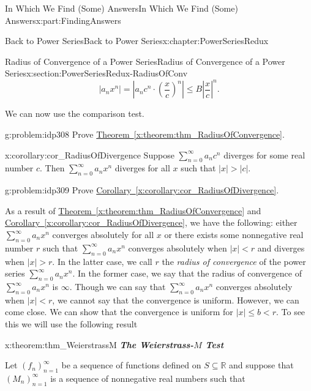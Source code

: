 \documentclass[oneside,10pt,]{book}
\newcommand{\xreffont}{\relax}
\newcommand{\alert}[1]{\textbf{\textit{#1}}}
\numberwithin{equation}{section}
\newcommand{\abs}[1]{\left|#1\right|}
\newcommand{\RR}{\mathbb {R}}
\newcommand{\lt}{<}
\begin{document}
\begin{partptx}{In Which We Find (Some) Answers}{}{In Which We Find (Some) Answers}{}{}{x:part:FindingAnswers}
\begin{chapterptx}{Back to Power Series}{}{Back to Power Series}{}{}{x:chapter:PowerSeriesRedux}
\begin{sectionptx}{Radius of Convergence of a Power Series}{}{Radius of Convergence of a Power Series}{}{}{x:section:PowerSeriesRedux-RadiusOfConv}
\begin{equation*}
\abs{a_nx^n}=\abs{a_nc^n\cdot\left(\frac{x}{c}\right)^n}\leq B\abs{\frac{x}{c}}^n\text{.}
\end{equation*}
%
\par
We can now use the comparison test.%
\begin{problem}{}{g:problem:idp308}%
 Prove \hyperref[x:theorem:thm_RadiusOfConvergence]{Theorem~{\xreffont\ref{x:theorem:thm_RadiusOfConvergence}}}.%
\end{problem}
\begin{corollary}{}{}{x:corollary:cor_RadiusOfDivergence}%
Suppose \(\sum_{n=0}^\infty a_nc^n\) diverges for some real number \(c\). Then \(\sum_{n=0}^\infty a_nx^n\) diverges for all \(x\) such that \(|x|>|c|\).%
\end{corollary}
\begin{problem}{}{g:problem:idp309}%
 Prove \hyperref[x:corollary:cor_RadiusOfDivergence]{Corollary~{\xreffont\ref{x:corollary:cor_RadiusOfDivergence}}}.%
\end{problem}
As a result of \hyperref[x:theorem:thm_RadiusOfConvergence]{Theorem~{\xreffont\ref{x:theorem:thm_RadiusOfConvergence}}} and \hyperref[x:corollary:cor_RadiusOfDivergence]{Corollary~{\xreffont\ref{x:corollary:cor_RadiusOfDivergence}}}, we have the following: either \(\sum_{n=0}^\infty a_nx^n\) converges absolutely for all \(x\) or there exists some nonnegative real number \(r\) such that \(\sum_{n=0}^\infty a_nx^n\) converges absolutely when \(|x|\lt r\) and diverges when \(|x|>r\). In the latter case, we call \(r\) the \emph{radius of convergence} of the power series \(\sum_{n=0}^{\infty}a_{n} x^{n}\). In the former case, we say that the radius of convergence of \(\sum_{n=0}^\infty a_nx^n\) is \(\infty\). Though we can say that \(\sum_{n=0}^\infty a_nx^n\) converges absolutely when \(|x|\lt r\), we cannot say that the convergence is uniform. However, we can come close. We can show that the convergence is uniform for \(|x|\leq b\lt r\). To see this we will use the following result%
\begin{theorem}{}{}{x:theorem:thm_WeierstrassM}%
\alert{The Weierstrass-\(M\) Test}%
\par
{} Let \(\left(f_n\right)_{n=1}^\infty\) be a sequence of functions defined on \(S\subseteq\RR\) and suppose that \(\left(M_n\right)_{n=1}^\infty\) is a sequence of nonnegative real numbers such that%

\end{theorem}
\end{sectionptx}
\end{chapterptx}
\end{partptx}
\end{document}
